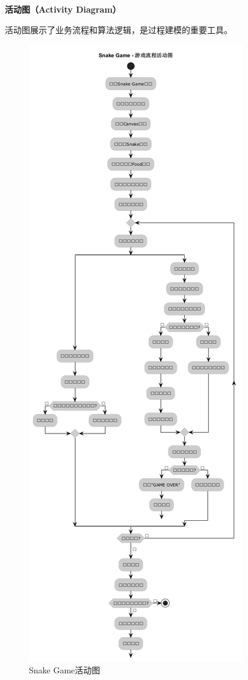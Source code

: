 \documentclass[a4paper]{article}
\begin{document}
\textbf{活动图（Activity Diagram）}

活动图展示了业务流程和算法逻辑，是过程建模的重要工具。

\begin{figure}[H]
\centering
\includegraphics[width=\textwidth]{img/Snake_Game_Activity.png}
\caption{Snake Game活动图}
\label{fig:snake_activity}
\end{figure}
\end{document}
